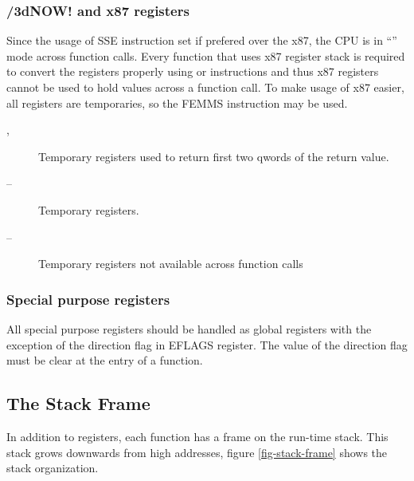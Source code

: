 \subsubsection {\MMX/3dNOW! and x87 registers}

Since the usage of SSE instruction set if prefered over the x87, the CPU is in
``\MMX'' mode across function calls. Every function that uses x87 register
stack is required to convert the registers properly using  or 
instructions and thus x87 registers cannot be used to hold values across a
function call.  To make usage of x87 easier, all \MMX{} registers are temporaries,
so the FEMMS instruction may be used.
\begin{description}
  \item [, ] Temporary registers used to return first two qwords of the return value.
  \item [ -- ] Temporary registers.
  \item [ -- ] Temporary registers not available across function calls
\end{description}


\subsubsection {Special purpose registers}
All special purpose registers should be handled as global registers
with the exception of the direction flag in EFLAGS register.  The
value of the direction flag must be clear at the entry of a function.

\subsection{The Stack Frame}
In addition to registers, each function has a frame on the run-time stack.  This
stack grows downwards from high addresses, figure \ref{fig-stack-frame} shows the
stack organization.


